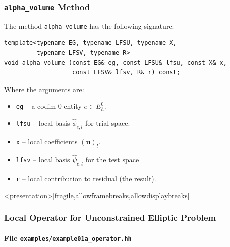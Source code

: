 \begin{frame}[fragile]
\frametitle{\lstinline{alpha_volume} Method}
The method \lstinline{alpha_volume} has the following signature: 
\begin{lstlisting}[basicstyle=\ttfamily\scriptsize]
template<typename EG, typename LFSU, typename X, 
         typename LFSV, typename R>
void alpha_volume (const EG& eg, const LFSU& lfsu, const X& x, 
                   const LFSV& lfsv, R& r) const;
\end{lstlisting}
Where the arguments are:
\begin{itemize}
\item \lstinline{eg} -- a codim 0 entity $e\in E_h^0$.
\item \lstinline{lfsu} -- local basis $\hat\phi_{e,l}$ for trial space.
\item \lstinline{x} -- local coefficients $(\mathbf{u})_l$.
\item \lstinline{lfsv} -- local basis $\hat\psi_{e,l}$ for the test space 
\item \lstinline{r} -- local contribution to residual (the result).
\end{itemize}
\end{frame}


\begin{frame}<presentation>[fragile,allowframebreaks,allowdisplaybreaks]
\frametitle<presentation>{Local Operator for Unconstrained Elliptic Problem}
\framesubtitle<presentation>{File \texttt{examples/example01a\_operator.hh}}

\end{frame}

